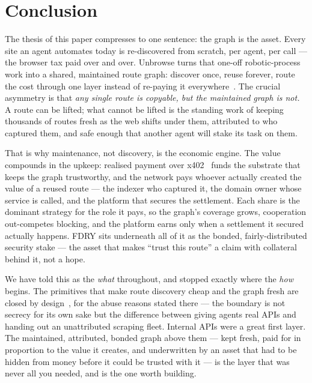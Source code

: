 \documentclass[11pt]{article}
\begin{document}
\section{Conclusion}

The thesis of this paper compresses to one sentence: the graph is the asset. Every
site an agent automates today is re-discovered from scratch, per agent, per call ---
the browser tax paid over and over. Unbrowse turns that one-off robotic-process work
into a shared, maintained route graph: discover once, reuse forever, route the cost
through one layer instead of re-paying it everywhere~\cite{internalapis}. The crucial
asymmetry is that \emph{any single route is copyable, but the maintained graph is
not.} A route can be lifted; what cannot be lifted is the standing work of keeping
thousands of routes fresh as the web shifts under them, attributed to who captured
them, and safe enough that another agent will stake its task on them.

That is why maintenance, not discovery, is the economic engine. The value compounds
in the upkeep: realised payment over x402~\cite{x402} funds the substrate that keeps
the graph trustworthy, and the network pays whoever actually created the value of a
reused route --- the indexer who captured it, the domain owner whose service is
called, and the platform that secures the settlement. Each share is the dominant
strategy for the role it pays, so the graph's coverage grows, cooperation
out-competes blocking, and the platform earns only when a settlement it secured
actually happens. FDRY sits underneath all of it as the bonded, fairly-distributed
security stake --- the asset that makes ``trust this route'' a claim with collateral
behind it, not a hope.

We have told this as the \emph{what} throughout, and stopped exactly where the
\emph{how} begins. The primitives that make route discovery cheap and the graph
fresh are closed by design~\cite{ossnotice}, for the abuse reasons stated there ---
the boundary is not secrecy for its own sake but the difference between giving agents
real APIs and handing out an unattributed scraping fleet. Internal APIs were a great
first layer. The maintained, attributed, bonded graph above them --- kept fresh,
paid for in proportion to the value it creates, and underwritten by an asset that
had to be hidden from money before it could be trusted with it --- is the layer that
was never all you needed, and is the one worth building.
\end{document}
